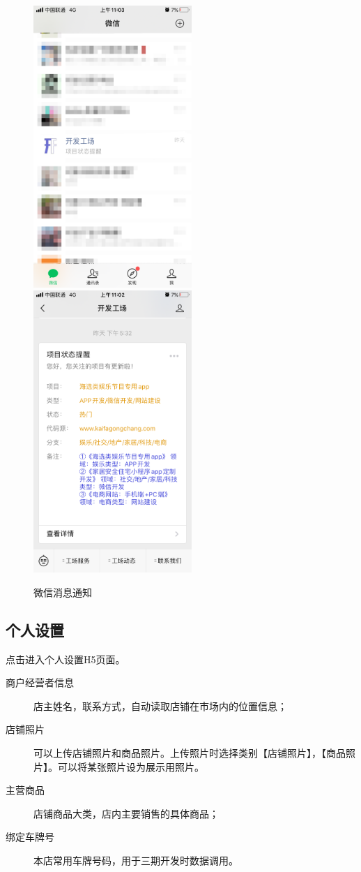 \documentclass[12pt,a4paper,openany]{ctexrep}
\begin{document}
\begin{figure}[htbp]
\centering
\includegraphics[width=6cm]{fig/wechat1.png}\qquad \qquad
\includegraphics[width=6cm]{fig/wechat2.png}
\caption{微信消息通知}
\label{wechat_message}
\end{figure}

\subsection{个人设置}
点击进入个人设置H5页面。
\begin{description}
\item[商户经营者信息]店主姓名，联系方式，自动读取店铺在市场内的位置信息；
\item[店铺照片]可以上传店铺照片和商品照片。上传照片时选择类别【店铺照片】，【商品照片】。可以将某张照片设为展示用照片\label{shop_cover}。
\item[主营商品]店铺商品大类，店内主要销售的具体商品\label{main_business}；
\item[绑定车牌号]本店常用车牌号码，用于三期开发时数据调用。
\end{description}
\end{document}

